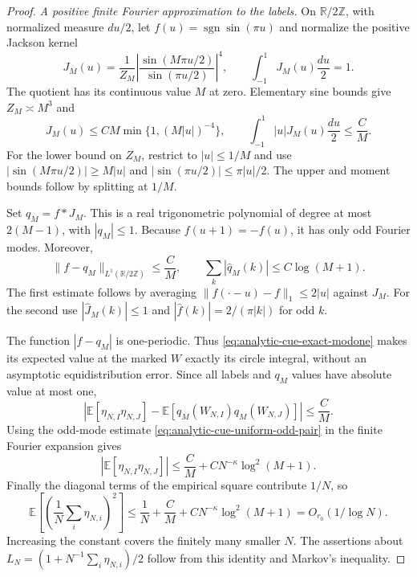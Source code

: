 \begin{proof}
\emph{A positive finite Fourier approximation to the labels.}
On $\mathbb R/2\mathbb Z$, with normalized measure $du/2$, let
$f(u)=\operatorname{sgn}\sin(\pi u)$ and normalize the positive
Jackson kernel
\[
 J_M(u)=\frac1{Z_M}
       \left|\frac{\sin(M\pi u/2)}{\sin(\pi u/2)}\right|^4,
 \qquad \int_{-1}^1J_M(u)\frac{du}{2}=1.
\]
The quotient has its continuous value $M$ at zero. Elementary
sine bounds give $Z_M\asymp M^3$ and
\[
 J_M(u)\le CM\min\{1,(M|u|)^{-4}\},\qquad
 \int_{-1}^1|u|J_M(u)\frac{du}{2}\le\frac CM.
\]
For the lower bound on $Z_M$, restrict to $|u|\le1/M$ and use
$|\sin(M\pi u/2)|\ge M|u|$ and
$|\sin(\pi u/2)|\le\pi|u|/2$. The upper and moment bounds follow
by splitting at $1/M$.

Set $q_M=f*J_M$. This is a real trigonometric polynomial of
degree at most $2(M-1)$, with $|q_M|\le1$. Because
$f(u+1)=-f(u)$, it has only odd Fourier modes. Moreover,
\begin{equation}\label{eq:analytic-cue-jackson-error}
 \|f-q_M\|_{L^1(\mathbb R/2\mathbb Z)}\le\frac CM,
 \qquad \sum_k|\widehat q_M(k)|\le C\log(M+1).
\end{equation}
The first estimate follows by averaging
$\|f(\cdot-u)-f\|_1\le2|u|$ against $J_M$. For the second use
$|\widehat J_M(k)|\le1$ and
$|\widehat f(k)|=2/(\pi|k|)$ for odd $k$.

The function $|f-q_M|$ is one-periodic. Thus
\eqref{eq:analytic-cue-exact-modone} makes its expected value at
the marked $W$ exactly its circle integral, without an
asymptotic equidistribution error. Since all labels and $q_M$
values have absolute value at most one,
\[
 \left|\mathbb E[\eta_{N,I}\eta_{N,J}]
       -\mathbb E[q_M(W_{N,I})q_M(W_{N,J})]\right|
                                             \le\frac CM.
\]
Using the odd-mode estimate
\eqref{eq:analytic-cue-uniform-odd-pair} in the finite Fourier
expansion gives
\[
 |\mathbb E[\eta_{N,I}\eta_{N,J}]|
       \le\frac CM+C N^{-\kappa}\log^2(M+1).
\]
Finally the diagonal terms of the empirical square contribute
$1/N$, so
\[
 \mathbb E\left[\left(\frac1N\sum_i\eta_{N,i}\right)^2\right]
 \le\frac1N+\frac CM+C N^{-\kappa}\log^2(M+1)
                              =O_{r_0}(1/\log N).
\]
Increasing the constant covers the finitely many smaller $N$.
The assertions about $L_N=(1+N^{-1}\sum_i\eta_{N,i})/2$ follow
from this identity and Markov's inequality.
\end{proof}

